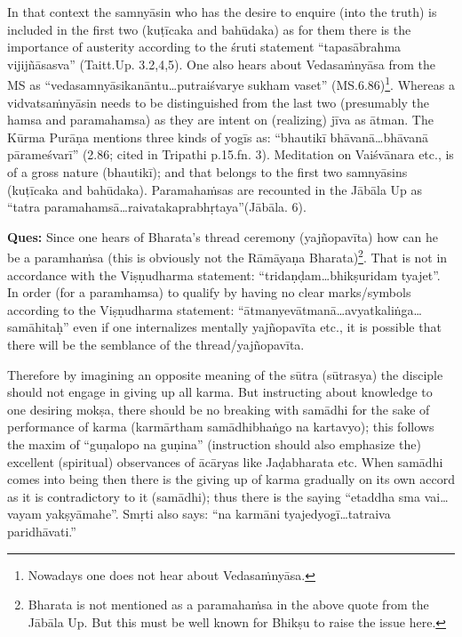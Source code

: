 In that context the samnyāsin who has the desire to enquire (into the truth) is included in the first two (kuṭīcaka and bahūdaka) as for them there is the importance of austerity according to the śruti statement “tapasābrahma vijijñāsasva” (Taitt.Up. 3.2,4,5). One also hears about Vedasaṁnyāsa from the MS as “vedasamnyāsikanāntu…putraiśvarye sukham vaset” (MS.6.86)\footnote{Nowadays one does not hear about Vedasaṁnyāsa.}. Whereas a vidvatsaṁnyāsin needs to be distinguished from the last two (presumably the hamsa and paramahamsa) as they are intent on (realizing) jīva as ātman. The Kūrma Purāṇa mentions three kinds of yogīs as:  “bhautikī bhāvanā…bhāvanā pārameśvarī” (2.86; cited in Tripathi p.15.fn. 3). Meditation on Vaiśvānara etc., is of a gross nature (bhautikī); and that belongs to the first two samnyāsins (kuṭīcaka and bahūdaka). Paramahaṁsas are recoun\-ted in the Jābāla Up as “tatra paramahamsā…raivatakaprabhṛtaya”\break (Jābāla. 6).

\textbf{Ques:} Since one hears of Bharata’s thread ceremony (yajñopavīta) how can he be a paramhaṁsa (this is obviously not the Rāmāyaṇa Bharata)\footnote{Bharata is not mentioned as a paramahaṁsa in the above quote from the Jābāla Up. But this must be well known for Bhikṣu to raise the issue here.}. That is not in accordance with the Viṣṇudharma statement:  “tridaṇ\-ḍam…bhikṣuridam tyajet”. In order (for a paramhamsa) to qualify by having no clear marks/symbols according to the Viṣṇudharma  statement: “ātmanyevātmanā…avyatkaliṅga…samāhitaḥ” even if one internalizes mentally yajñopavīta etc., it is possible that there will be the semblance of the thread/yajñopavīta.

Therefore by imagining an opposite meaning of the sūtra (sūtrasya) the disciple should not engage in giving up all karma. But instructing about knowledge to one desiring mokṣa, there should be no breaking with samādhi for the sake of performance of karma (karmārtham samādhibhaṅgo na kartavyo); this follows the maxim of “guṇalopo na guṇina” (instruction should also emphasize the) excellent (spiritual) observances of ācāryas like Jaḍabharata etc. When samādhi comes into being then there is the giving up of karma gradually on its own accord as it is contradictory to it (samādhi); thus there is the saying “etaddha sma vai…vayam yakṣyāmahe”. Smṛti also says: “na karmāni tyajedyogī…tatraiva paridhāvati.”

